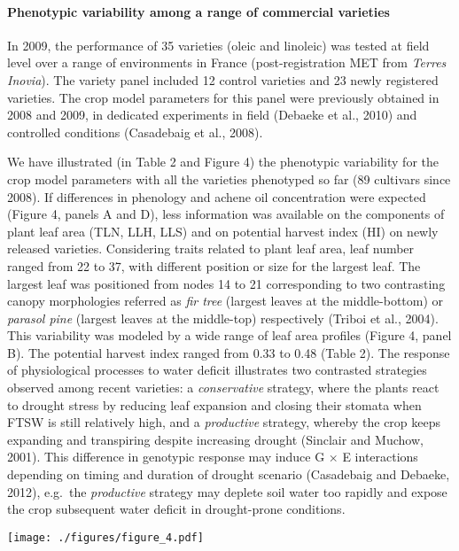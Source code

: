 \documentclass[a4paper]{article}
\let\oldparagraph\paragraph
\renewcommand{\paragraph}[1]{\oldparagraph{#1}\mbox{}}
\begin{document}
\paragraph{Phenotypic variability among a range of commercial
varieties}\label{phenotypic-variability-among-a-range-of-commercial-varieties}

In 2009, the performance of 35 varieties (oleic and linoleic) was tested
at field level over a range of environments in France (post-registration
MET from \emph{Terres Inovia}). The variety panel included 12 control
varieties and 23 newly registered varieties. The crop model parameters
for this panel were previously obtained in 2008 and 2009, in dedicated
experiments in field (Debaeke et al., 2010) and controlled conditions
(Casadebaig et al., 2008).

We have illustrated (in Table 2 and Figure 4) the phenotypic variability
for the crop model parameters with all the varieties phenotyped so far
(89 cultivars since 2008). If differences in phenology and achene oil
concentration were expected (Figure 4, panels A and D), less information
was available on the components of plant leaf area (TLN, LLH, LLS) and
on potential harvest index (HI) on newly released varieties. Considering
traits related to plant leaf area, leaf number ranged from 22 to 37,
with different position or size for the largest leaf. The largest leaf
was positioned from nodes 14 to 21 corresponding to two contrasting
canopy morphologies referred as \emph{fir tree} (largest leaves at the
middle-bottom) or \emph{parasol pine} (largest leaves at the middle-top)
respectively (Triboi et al., 2004). This variability was modeled by a
wide range of leaf area profiles (Figure 4, panel B). The potential
harvest index ranged from 0.33 to 0.48 (Table 2). The response of
physiological processes to water deficit illustrates two contrasted
strategies observed among recent varieties: a \emph{conservative}
strategy, where the plants react to drought stress by reducing leaf
expansion and closing their stomata when FTSW is still relatively high,
and a \emph{productive} strategy, whereby the crop keeps expanding and
transpiring despite increasing drought (Sinclair and Muchow, 2001). This
difference in genotypic response may induce G \(\times\) E interactions
depending on timing and duration of drought scenario (Casadebaig and
Debaeke, 2012), e.g.~the \emph{productive} strategy may deplete soil
water too rapidly and expose the crop subsequent water deficit in
drought-prone conditions.

\texttt{[image: ./figures/figure\_4.pdf]}
\end{document}
